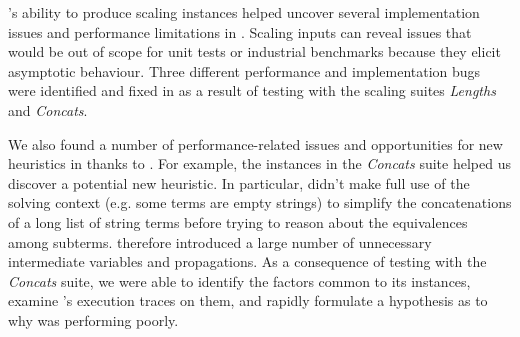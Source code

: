 \fuzzer{}'s ability to produce scaling instances helped uncover several
implementation issues and performance limitations in \us{}. Scaling inputs
can reveal issues that would be out of scope for unit tests or
industrial benchmarks because they elicit asymptotic behaviour. Three different
performance and implementation bugs were identified and fixed in \us{}
as a result of testing with the \fuzzer{} scaling suites
\textit{Lengths} and \textit{Concats}.

We also found a number of performance-related issues and opportunities for
new heuristics in \us{} thanks to \fuzzer{}. For example, the
instances in the \textit{Concats} suite helped us discover a
potential new heuristic. In particular, \us{} didn't
make full use of the solving context (e.g. some terms are empty
strings) to simplify the concatenations of a long list of string terms
before trying to reason about the equivalences among subterms. \us{}
therefore introduced a large number of unnecessary intermediate
variables and propagations. As a consequence of
testing \us{} with the \textit{Concats} suite, we were able to
identify the factors common to its instances, examine \us{}'s execution
traces on them, and rapidly formulate a hypothesis as to why \us{}
was performing poorly.
